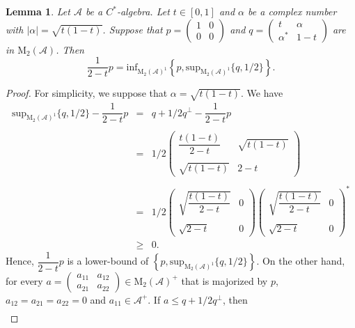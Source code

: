 \documentclass[12pt]{amsart}
\newtheorem{lem}[thm]{Lemma}
\theoremstyle{definition}
\theoremstyle{remark}
\numberwithin{equation}{section}
\begin{document}
\begin{lem}\label{Homo}
Let $\mathcal{A}$ be a $C^*$-algebra. Let $t\in[0,1]$ and $\alpha$ be a complex number with   $|\alpha|=\sqrt{t(1-t)}$. Suppose that $p=\begin{pmatrix}
	1 & 0 \\ 
	0 & 0
\end{pmatrix}$ and $q=\begin{pmatrix}
	t                & \alpha\\
	\alpha^* & 1-t
\end{pmatrix}$ are in $\mathrm{M}_2(\mathcal{A})$. Then $$\frac{1}{2-t}p=\mathrm{inf}_{\mathrm{M}_2(\mathcal{A})^1}\left\lbrace p,\mathrm{sup}_{\mathrm{M}_2(\mathcal{A})^1}\{q,1/2\}\right\rbrace.$$
\end{lem}
\begin{proof}
For simplicity, we suppose that $\alpha=\sqrt{t(1-t)}$.  We have $$\begin{array}{llllllllllllllll}
	\mathrm{sup}_{\mathrm{M}_2(\mathcal{A})^1}\{q,1/2\}-\dfrac{1}{2-t}p &=& q+1/2q^\perp-\dfrac{1}{2-t}p \\
	\\
	&=&1/2 \begin{pmatrix}
		\dfrac{t(1-t)}{2-t} & \sqrt{t(1-t)}\\ \\
		\sqrt{t(1-t)} & 2-t
	\end{pmatrix}\\ \\
	&=& 1/2 \begin{pmatrix}
		\sqrt{\dfrac{t(1-t)}{2-t}} & 0\\ \\
		\sqrt{2-t} &  0
	\end{pmatrix}  \begin{pmatrix}
		\sqrt{\dfrac{t(1-t)}{2-t}} & 0\\ \\
		\sqrt{2-t} &  0
	\end{pmatrix}^* \\ 
	&\geq& 0.
\end{array}$$	
Hence, $\dfrac{1}{2-t}p$ is a lower-bound of $\left\lbrace p,\mathrm{sup}_{\mathrm{M}_2(\mathcal{A})^1}\{q,1/2\}\right\rbrace $. On the other hand, for every  $a=\begin{pmatrix}
	a_{11}&a_{12}\\
	a_{21} & a_{22}
\end{pmatrix}\in \mathrm{M}_2(\mathcal{A})^+$ that is majorized by $p$, $a_{12}=a_{21}=a_{22}=0$ and $a_{11}\in\mathcal{A}^+$. If $a\leq q+1/2q^\perp$, then   $$\begin{array}{llllllll}

\end{array}$$
\end{proof}
\end{document}
